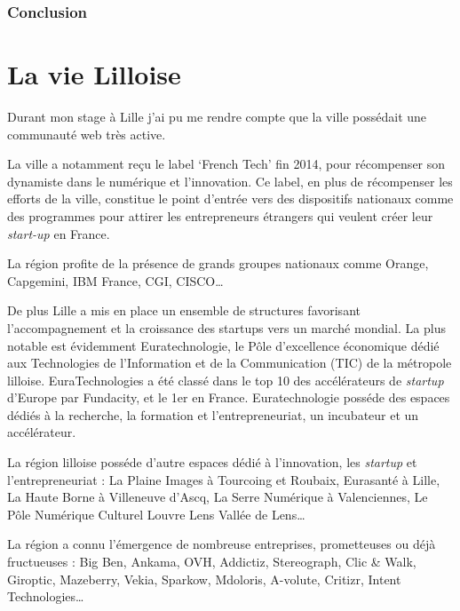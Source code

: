 \subsubsection{Conclusion}\label{conclusion-1}

\newpage

\section{La vie Lilloise}\label{la-vie-lilloise}

Durant mon stage à Lille j'ai pu me rendre compte que la ville possédait
une communauté web très active.

\bigskip

La ville a notamment reçu le label `French Tech' fin 2014, pour
récompenser son dynamiste dans le numérique et l'innovation. Ce label,
en plus de récompenser les efforts de la ville, constitue le point
d'entrée vers des dispositifs nationaux comme des programmes pour
attirer les entrepreneurs étrangers qui veulent créer leur
\emph{start-up} en France.

\bigskip

La région profite de la présence de grands groupes nationaux comme
Orange, Capgemini, IBM France, CGI, CISCO\ldots{}

\bigskip

De plus Lille a mis en place un ensemble de structures favorisant
l'accompagnement et la croissance des startups vers un marché mondial.
La plus notable est évidemment Euratechnologie, le Pôle d'excellence
économique dédié aux Technologies de l'Information et de la
Communication (TIC) de la métropole lilloise. EuraTechnologies a été
classé dans le top 10 des accélérateurs de \emph{startup} d'Europe par
Fundacity, et le 1er en France. Euratechnologie posséde des espaces
dédiés à la recherche, la formation et l'entrepreneuriat, un incubateur
et un accélérateur.

\bigskip

La région lilloise posséde d'autre espaces dédié à l'innovation, les
\emph{startup} et l'entrepreneuriat : La Plaine Images à Tourcoing et
Roubaix, Eurasanté à Lille, La Haute Borne à Villeneuve d'Ascq, La Serre
Numérique à Valenciennes, Le Pôle Numérique Culturel Louvre Lens Vallée
de Lens\ldots{}

\bigskip

La région a connu l'émergence de nombreuse entreprises, prometteuses ou
déjà fructueuses : Big Ben, Ankama, OVH, Addictiz, Stereograph, Clic \&
Walk, Giroptic, Mazeberry, Vekia, Sparkow, Mdoloris, A-volute, Critizr,
Intent Technologies\ldots{}

